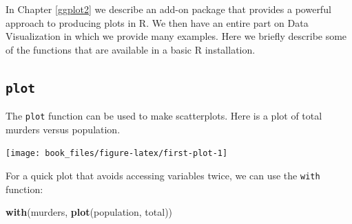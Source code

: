 \documentclass[
]{krantz}
\newenvironment{Shaded}{\begin{snugshade}}{\end{snugshade}}
\newcommand{\DecValTok}[1]{\textcolor[rgb]{0.06,0.06,0.06}{#1}}
\newcommand{\KeywordTok}[1]{\textcolor[rgb]{0.27,0.27,0.27}{\textbf{#1}}}
\newcommand{\NormalTok}[1]{#1}
\newcommand{\OperatorTok}[1]{\textcolor[rgb]{0.43,0.43,0.43}{\textbf{#1}}}
\newcommand{\StringTok}[1]{\textcolor[rgb]{0.5,0.5,0.5}{#1}}
\begin{document}
In Chapter \ref{ggplot2} we describe an add-on package that provides a powerful approach to producing plots in R. We then have an entire part on Data Visualization in which we provide many examples. Here we briefly describe some of the functions that are available in a basic R installation.

\hypertarget{plot}{%
\subsection{\texorpdfstring{\texttt{plot}}{plot}}\label{plot}}

The \texttt{plot} function can be used to make scatterplots. Here is a plot of total murders versus population.

\begin{Shaded}
\end{Shaded}

\begin{Shaded}
\end{Shaded}

\begin{center}\texttt{[image: book\_files/figure-latex/first-plot-1]} \end{center}

For a quick plot that avoids accessing variables twice, we can use the \texttt{with} function:

\begin{Shaded}
\begin{Highlighting}[]
\KeywordTok{with}\NormalTok{(murders, }\KeywordTok{plot}\NormalTok{(population, total))}
\end{Highlighting}
\end{Shaded}
\end{document}
